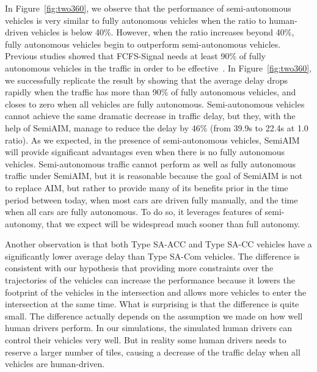 In Figure~\ref{fig:two360}, we observe that the performance of
semi-autonomous vehicles is very similar to fully autonomous vehicles
when the ratio to human-driven vehicles is below 40\%.  However, when
the ratio increases beyond 40\%, fully autonomous vehicles begin to
outperform semi-autonomous vehicles.  Previous studies showed that
FCFS-Signal needs at least 90\% of fully autonomous vehicles in the
traffic in order to be effective~\cite{bib:Dresner07Sharing}.  In
Figure~\ref{fig:two360}, we successfully replicate the result by
showing that the average delay drops rapidly when the traffic has more
than 90\% of fully autonomous vehicles, and closes to zero when all
vehicles are fully autonomous.  Semi-autonomous vehicles cannot
achieve the same dramatic decrease in traffic delay, but they, with
the help of SemiAIM, manage to reduce the delay by 46\% (from 39.9s to
22.4s at 1.0 ratio).  As we expected, in the presence of
semi-autonomous vehicles, SemiAIM will provide significant advantages
even when there is no fully autonomous vehicles.  Semi-autonomous
traffic cannot perform as well as fully autonomous traffic under
SemiAIM, but it is reasonable because the goal of SemiAIM is not to
replace AIM, but rather to provide many of its benefits prior in the
time period between today, when most cars are driven fully manually,
and the time when all cars are fully autonomous.  To do so, it
leverages features of semi-autonomy, that we expect will be widespread
much sooner than full autonomy.

Another observation is that both Type SA-ACC and Type SA-CC vehicles
have a significantly lower average delay than Type SA-Com vehicles.
The difference is consistent with our hypothesis that providing more
constraints over the trajectories of the vehicles can increase the
performance because it lowers the footprint of the vehicles in the
intersection and allows more vehicles to enter the intersection at the
same time.  What is surprising is that the difference is quite small.
The difference actually depends on the assumption we made on how well
human drivers perform. In our simulations, the simulated human drivers
can control their vehicles very well.  But in reality some human
drivers needs to reserve a larger number of tiles, causing a decrease
of the traffic delay when all vehicles are human-driven.





